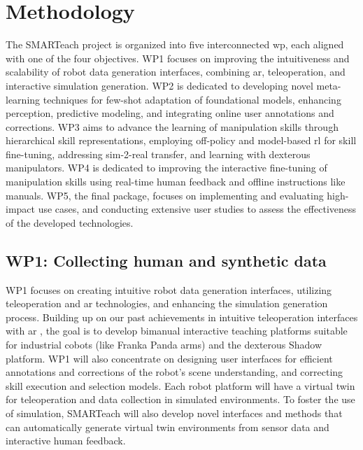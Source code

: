 \documentclass{erc-B2}
\begin{document}
\section{Methodology}
The SMARTeach project is organized into five interconnected \gls*{wp}, each aligned with one of the four objectives. WP1 focuses on improving the intuitiveness and scalability of robot data generation interfaces, combining \gls*{ar}, teleoperation, and interactive simulation generation. WP2 is dedicated to developing novel meta-learning techniques for few-shot adaptation of foundational models, enhancing perception, predictive modeling, and integrating online user annotations and corrections. WP3 aims to advance the learning of manipulation skills through hierarchical skill representations, employing off-policy and model-based \gls*{rl} for skill fine-tuning, addressing sim-2-real transfer, and learning with dexterous manipulators.
WP4 is dedicated to improving the interactive fine-tuning of manipulation skills using real-time human feedback and offline instructions like manuals. WP5, the final package, focuses on implementing and evaluating high-impact use cases, and conducting extensive user studies to assess the effectiveness of the developed technologies.


\subsection{WP1: Collecting human and synthetic data}
WP1 focuses on creating intuitive robot data generation interfaces, utilizing teleoperation and \gls*{ar} technologies, and enhancing the simulation generation process. Building up on our past achievements in intuitive teleoperation interfaces with \gls*{ar} \cite{jiang2023user}, the goal is to develop bimanual interactive teaching platforms suitable for industrial cobots (like Franka Panda arms) and the dexterous Shadow platform. WP1 will also concentrate on designing user interfaces for efficient annotations and corrections of the robot’s scene understanding, and correcting skill execution and selection models.  Each robot platform will have a virtual twin for teleoperation and data collection in simulated environments. To foster the use of simulation, SMARTeach will also develop novel interfaces and  methods that can automatically generate virtual twin environments from sensor data and interactive human feedback. 
\end{document}
